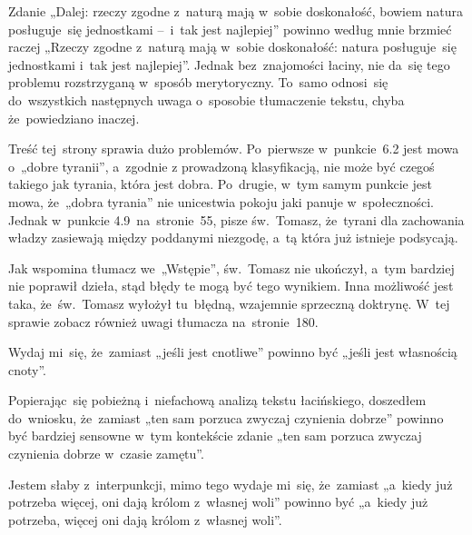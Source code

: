 \documentclass[a4paper,11pt]{article}
\begin{document}
\vspace{\spaceFour}



\start {} Zdanie „Dalej: rzeczy zgodne z~naturą mają
w~sobie doskonałość, bowiem natura posługuje~się jednostkami --~i~tak
jest najlepiej” powinno według mnie brzmieć raczej „Rzeczy zgodne
z~naturą mają w~sobie doskonałość: natura posługuje~się jednostkami
i~tak jest najlepiej”. Jednak bez~znajomości łaciny, nie da~się tego
problemu rozstrzyganą w~sposób merytoryczny. To~samo odnosi~się
do~wszystkich następnych uwaga o~sposobie tłumaczenie tekstu, chyba
że~powiedziano inaczej.

\vspace{\spaceFour}



\start {} Treść tej~strony sprawia dużo problemów. Po~pierwsze
w~punkcie~6.2 jest mowa o~„dobre tyranii”, a~zgodnie z prowadzoną
klasyfikacją, nie może być czegoś takiego jak tyrania, która jest
dobra. Po~drugie, w~tym samym punkcie jest mowa, że~„dobra tyrania”
nie unicestwia pokoju jaki panuje w~społeczności. Jednak w~punkcie
4.9~na~stronie~55, pisze św.~Tomasz, że~tyrani dla zachowania władzy
zasiewają między poddanymi niezgodę, a~tą która już istnieje
podsycają.

Jak wspomina tłumacz we~„Wstępie”, św.~Tomasz nie ukończył, a~tym
bardziej nie poprawił dzieła, stąd błędy te mogą być tego wynikiem.
Inna możliwość jest taka, że~św.~Tomasz wyłożył tu~błędną, wzajemnie
sprzeczną doktrynę. W~tej sprawie zobacz również uwagi tłumacza
na~stronie~180.

\vspace{\spaceFour}



\start {} Wydaj mi~się, że~zamiast „jeśli jest cnotliwe”
powinno być „jeśli jest własnością cnoty”.

\vspace{\spaceFour}



\start {} Popierając~się pobieżną i~niefachową analizą
tekstu łacińskiego, doszedłem do~wniosku, że~zamiast „ten sam porzuca
zwyczaj czynienia dobrze” powinno być bardziej sensowne w~tym
kontekście zdanie „ten sam porzuca zwyczaj czynienia dobrze w~czasie
zamętu”.

\vspace{\spaceFour}



\start {} Jestem słaby z~interpunkcji, mimo tego wydaje
mi~się, że~zamiast „a~kiedy już potrzeba więcej, oni dają królom
z~własnej woli” powinno być „a~kiedy już potrzeba, więcej oni dają
królom z~własnej woli”.
\end{document}
